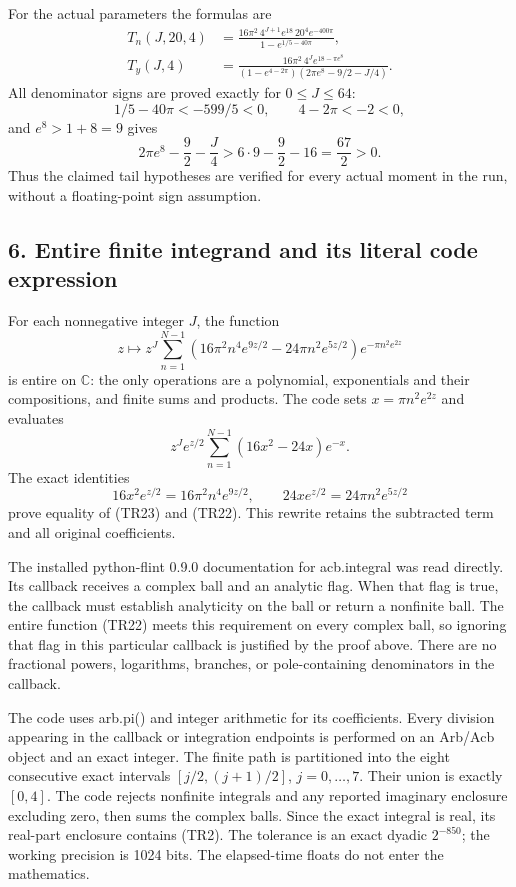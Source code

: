 For the actual parameters the formulas are \[
 \begin{aligned}
 T_n(J,20,4)&=
 \frac{16\pi^2\,4^{J+1}e^{18}\,20^4e^{-400\pi}}
 {1-e^{1/5-40\pi}},\\
 T_y(J,4)&=
 \frac{16\pi^2\,4^Je^{18-\pi e^8}}
 {(1-e^{4-2\pi})(2\pi e^8-9/2-J/4)}.
 \end{aligned}
 \tag{TR19}
\] All denominator signs are proved exactly for \(0\leq J\leq64\): \[
 1/5-40\pi<-599/5<0,\qquad4-2\pi<-2<0,
 \tag{TR20}
\] and \(e^8>1+8=9\) gives \[
 2\pi e^8-\frac92-\frac J4
 >6\cdot9-\frac92-16=\frac{67}{2}>0.
 \tag{TR21}
\] Thus the claimed tail hypotheses are verified for every actual moment in the run, without a floating-point sign assumption.

\subsection{6. Entire finite integrand and its literal code expression}\label{C47stage:TR:entire-finite-integrand-and-its-literal-code-expression}

For each nonnegative integer \(J\), the function \[
 z\longmapsto z^J\sum_{n=1}^{N-1}
 (16\pi^2n^4e^{9z/2}-24\pi n^2e^{5z/2})
 e^{-\pi n^2e^{2z}}
 \tag{TR22}
\] is entire on \(\mathbb C\): the only operations are a polynomial, exponentials and their compositions, and finite sums and products. The code sets \(x=\pi n^2e^{2z}\) and evaluates \[
 z^Je^{z/2}\sum_{n=1}^{N-1}(16x^2-24x)e^{-x}.
 \tag{TR23}
\] The exact identities \[
 16x^2e^{z/2}=16\pi^2n^4e^{9z/2},
 \qquad24xe^{z/2}=24\pi n^2e^{5z/2}
 \tag{TR24}
\] prove equality of (TR23) and (TR22). This rewrite retains the subtracted term and all original coefficients.

The installed python-flint 0.9.0 documentation for acb.integral was read directly. Its callback receives a complex ball and an analytic flag. When that flag is true, the callback must establish analyticity on the ball or return a nonfinite ball. The entire function (TR22) meets this requirement on every complex ball, so ignoring that flag in this particular callback is justified by the proof above. There are no fractional powers, logarithms, branches, or pole-containing denominators in the callback.

The code uses arb.pi() and integer arithmetic for its coefficients. Every division appearing in the callback or integration endpoints is performed on an Arb/Acb object and an exact integer. The finite path is partitioned into the eight consecutive exact intervals \([j/2,(j+1)/2]\), \(j=0,\ldots,7\). Their union is exactly \([0,4]\). The code rejects nonfinite integrals and any reported imaginary enclosure excluding zero, then sums the complex balls. Since the exact integral is real, its real-part enclosure contains (TR2). The tolerance is an exact dyadic \(2^{-850}\); the working precision is 1024 bits. The elapsed-time floats do not enter the mathematics.

